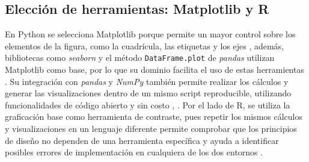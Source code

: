     \subsection{Elección de herramientas: Matplotlib y R}
    \label{tools_choice}
        En Python se selecciona Matplotlib porque permite un mayor control sobre 
        los elementos de la figura, como la cuadrícula, las etiquetas y los ejes
        \cite{castro2026ciencia}, además, bibliotecas como \textit{seaborn} y el 
        método \texttt{DataFrame.plot} de \textit{pandas} utilizan Matplotlib 
        como base, por lo que su dominio facilita el uso de estas herramientas
        \cite{hunter2007matplotlib}. Su integración con \textit{pandas} y
        \textit{NumPy} también permite realizar los cálculos y generar las
        visualizaciones dentro de un mismo script reproducible, utilizando 
        funcionalidades de código abierto y sin costo \cite{mckinney2010data}, 
        \cite{harris2020array}. Por el lado de R, se utiliza la graficación base 
        como herramienta de contraste, pues repetir los mismos cálculos y 
        visualizaciones en un lenguaje diferente permite comprobar que los 
        principios de diseño no dependen de una herramienta específica y 
        ayuda a identificar posibles errores de implementación en cualquiera de 
        los dos entornos \cite{castro2026ciencia}.
